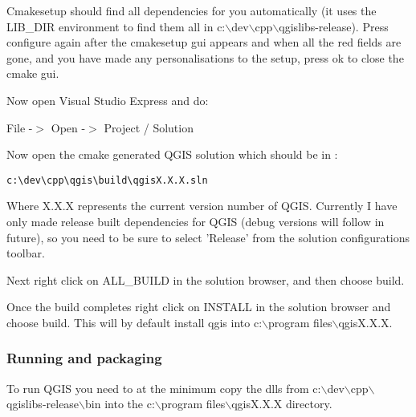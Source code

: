 Cmakesetup should find all dependencies for you automatically (it uses the 
LIB\_DIR environment to find them all in c:$\backslash$dev$\backslash$cpp$\backslash$qgislibs-release). 
Press configure again after the cmakesetup gui appears and when all the red 
fields are gone, and you have made any personalisations to the setup, press 
ok to close the cmake gui.

Now open Visual Studio Express and do:

File -$>$ Open -$>$ Project / Solution

Now open the cmake generated QGIS solution which should be in :

\begin{verbatim}
c:\dev\cpp\qgis\build\qgisX.X.X.sln
\end{verbatim}

Where X.X.X represents the current version number of QGIS. Currently I 
have only made release built dependencies for QGIS (debug versions will follow 
in future), so you need to be sure to select 'Release' from the solution 
configurations toolbar.

Next right click on ALL\_BUILD in the solution browser, and then choose build.

Once the build completes right click on INSTALL in the solution browser and 
choose build. This will by default install qgis into c:$\backslash$program files$\backslash$qgisX.X.X.

\hypertarget{toc108}{}
\subsubsection{Running and packaging}
To run QGIS you need to at the minimum copy the dlls from c:$\backslash$dev$\backslash$cpp$\backslash$qgislibs-release$\backslash$bin 
into the c:$\backslash$program files$\backslash$qgisX.X.X directory.





